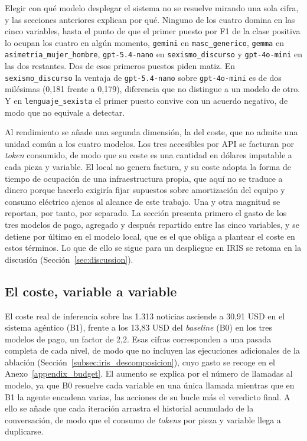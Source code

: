 Elegir con qué modelo desplegar el sistema no se resuelve mirando una sola cifra, y
las secciones anteriores explican por qué. Ninguno de los cuatro domina en las cinco
variables, hasta el punto de que el primer puesto por F1 de la clase positiva lo
ocupan los cuatro en algún momento, \texttt{gemini} en \texttt{masc\_generico},
\texttt{gemma} en \texttt{asimetria\_mujer\_hombre}, \texttt{gpt-5.4-nano} en
\texttt{sexismo\_discurso} y \texttt{gpt-4o-mini} en las dos restantes. Dos de esos
primeros puestos piden matiz. En \texttt{sexismo\_discurso} la ventaja de
\texttt{gpt-5.4-nano} sobre \texttt{gpt-4o-mini} es de dos milésimas (0,181 frente a
0,179), diferencia que no distingue a un modelo de otro. Y en
\texttt{lenguaje\_sexista} el primer puesto convive con un acuerdo negativo, de modo
que no equivale a detectar.

Al rendimiento se añade una segunda dimensión, la del coste, que no admite una unidad
común a los cuatro modelos. Los tres accesibles por API se facturan por
\textit{token} consumido, de modo que su coste es una cantidad en dólares imputable a
cada pieza y variable. El local no genera factura, y su coste adopta la forma de
tiempo de ocupación de una infraestructura propia, que aquí no se traduce a dinero
porque hacerlo exigiría fijar supuestos sobre amortización del equipo y consumo
eléctrico ajenos al alcance de este trabajo. Una y otra magnitud se reportan, por
tanto, por separado. La sección presenta primero el gasto de los tres modelos de
pago, agregado y después repartido entre las cinco variables, y se detiene por último
en el modelo local, que es el que obliga a plantear el coste en estos términos. Lo que
de ello se sigue para un despliegue en IRIS se retoma en la discusión
(Sección~\ref{sec:discussion}).

\subsection{El coste, variable a variable}

El coste real de inferencia sobre las 1.313 noticias asciende a 30,91 USD en el
sistema agéntico (B1), frente a los 13,83 USD del \textit{baseline} (B0) en los tres
modelos de pago, un factor de 2,2. Esas cifras corresponden a una pasada completa
de cada nivel, de modo que no incluyen las ejecuciones adicionales de la ablación
(Sección~\ref{subsec:iris_descomposicion}), cuyo gasto se recoge en el Anexo~\ref{appendix_budget}. El aumento se
explica por el número de llamadas al modelo, ya que B0 resuelve cada variable en una
única llamada mientras que en B1 la agente encadena varias, las acciones de su bucle
más el veredicto final. A ello se añade que cada iteración arrastra el historial
acumulado de la conversación, de modo que el consumo de \textit{tokens} por pieza y
variable llega a duplicarse.

